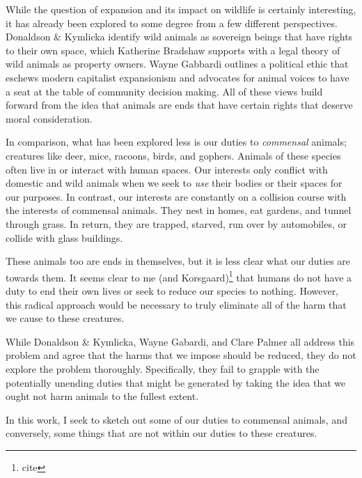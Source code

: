 		While the question of expansion and its impact on wildlife is certainly
		interesting, it has already been explored to some degree from a few
		different perspectives. Donaldson \& Kymlicka identify wild animals as
		sovereign beings that have rights to their own space, which Katherine
		Bradshaw supports with a legal theory of wild animals as property
		owners. Wayne Gabbardi outlines a political ethic that eschews modern
		capitalist expansionism and advocates for animal voices to have a seat
		at the table of community decision making. All of these views build
		forward from the idea that animals are ends that have certain rights
		that deserve moral consideration.

		In comparison, what has been explored less is our duties to
		\emph{commensal} animals; creatures like deer, mice, racoons, birds,
		and gophers.  Animals of these species often live in or interact with
		human spaces.  Our interests only conflict with domestic and wild
		animals when we seek to \emph{use} their bodies or their spaces for our
		purposes. In contrast, our interests are constantly on a collision
		course with the interests of commensal animals. They nest in homes, eat
		gardens, and tunnel through grass. In return, they are trapped,
		starved, run over by automobiles, or collide with glass buildings.

		These animals too are ends in themselves, but it is less clear what our
		duties are towards them. It seems clear to me (and
		Korsgaard)\footnote{cite} that humans do not have a duty to end their
		own lives or seek to reduce our species to nothing. However, this
		radical approach would be necessary to truly eliminate all of the harm
		that we cause to these creatures.

		While Donaldson \& Kymlicka, Wayne Gabardi, and Clare Palmer all
		address this problem and agree that the harms that we impose should be
		reduced, they do not explore the problem thoroughly.  Specifically,
		they fail to grapple with the potentially unending duties that might be
		generated by taking the idea that we ought not harm animals to the
		fullest extent.

		In this work, I seek to sketch out some of our duties to commensal
		animals, and conversely, some things that are not within our duties to
		these creatures.
